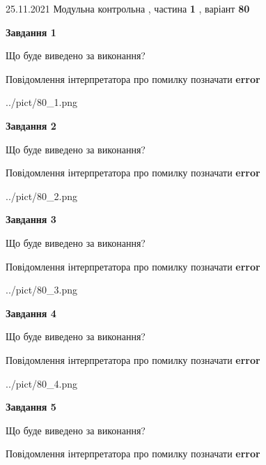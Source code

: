 \documentclass[10pt, ukrainian]{article}
\begin{document}
{25.11.2021 Модульна контрольна , частина \textbf { 1 }, варіант  \No \textbf { 80 }\par}
{
\begin {large}

{\begin {center}\textbf{Завдання 1}\end {center}}\par
Що буде виведено за виконання? \par
Повідомлення інтерпретатора про помилку позначати \textbf{error}

\begin{center}
	{../pict/80_1.png}
\end{center}
\newpage

{\begin {center}\textbf{Завдання 2}\end {center}}\par
Що буде виведено за виконання? \par
Повідомлення інтерпретатора про помилку позначати \textbf{error}

\begin{center}
	{../pict/80_2.png}
\end{center}
\newpage

{\begin {center}\textbf{Завдання 3}\end {center}}\par
Що буде виведено за виконання? \par
Повідомлення інтерпретатора про помилку позначати \textbf{error}

\begin{center}
	{../pict/80_3.png}
\end{center}
\newpage

{\begin {center}\textbf{Завдання 4}\end {center}}\par
Що буде виведено за виконання? \par
Повідомлення інтерпретатора про помилку позначати \textbf{error}

\begin{center}
	{../pict/80_4.png}
\end{center}
\newpage

{\begin {center}\textbf{Завдання 5}\end {center}}\par
Що буде виведено за виконання? \par
Повідомлення інтерпретатора про помилку позначати \textbf{error}


\end{large}}
\end{document}
